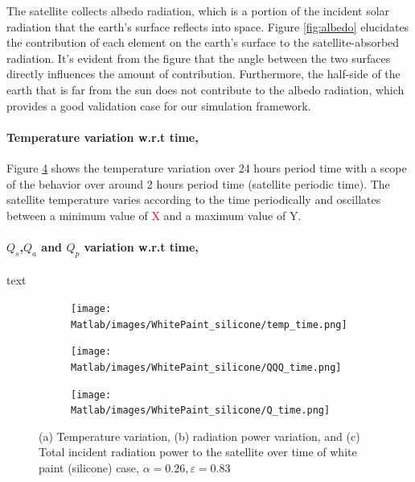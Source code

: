 \documentclass[11pt]{article}
\begin{document}
The satellite collects albedo radiation, which is a portion of the incident solar radiation that the earth's surface reflects into space. Figure \ref{fig:albedo} elucidates the contribution of each element on the earth's surface to the satellite-absorbed radiation. It's evident from the figure that the angle between the two surfaces directly influences the amount of contribution. Furthermore, the half-side of the earth that is far from the sun does not contribute to the albedo radiation, which provides a good validation case for our simulation framework.

 \newpage

\paragraph{Temperature variation w.r.t time,}
Figure \ref{fig:temptime} shows the temperature variation over 24 hours period time with a scope of the behavior over around 2 hours period time (satellite periodic time). The satellite temperature varies according to the time periodically and oscillates between a minimum value of \textcolor{red}{X} and a maximum value of Y.  

\paragraph{$Q_{s}$,$Q_{a}$ and $Q_{p}$ variation w.r.t time,}
text

\begin{figure}[H]
    \centering
    \begin{subfigure}[b]{1\textwidth}
        \texttt{[image: Matlab/images/WhitePaint\_silicone/temp\_time.png]}
        \caption{}
        \label{fig:temptime}
    \end{subfigure}
    \begin{subfigure}[b]{1\textwidth}
        \texttt{[image: Matlab/images/WhitePaint\_silicone/QQQ\_time.png]}
        \caption{}
        \label{fig:temptime}
    \end{subfigure}
    \begin{subfigure}[b]{1\textwidth}
        \texttt{[image: Matlab/images/WhitePaint\_silicone/Q\_time.png]}
        \caption{}
        \label{fig:temptime}
    \end{subfigure}
    \caption{(a) Temperature variation, (b) radiation power variation, and (c) Total incident radiation power to the satellite over time of white paint (silicone) case, $\alpha=0.26, \varepsilon = 0.83$}
\end{figure}
\end{document}
